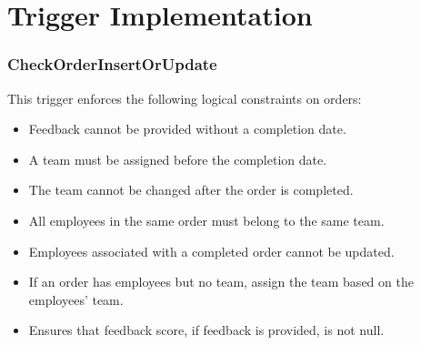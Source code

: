 \chapter{Trigger Implementation}

\subsection*{CheckOrderInsertOrUpdate}
This trigger enforces the following logical constraints on orders:
\begin{itemize}[label=-]
    \item Feedback cannot be provided without a completion date.
    \item A team must be assigned before the completion date.
    \item The team cannot be changed after the order is completed.
    \item All employees in the same order must belong to the same team.
    \item Employees associated with a completed order cannot be updated.
    \item If an order has employees but no team, assign the team based on the employees' team.
    \item Ensures that feedback score, if feedback is provided, is not null.
\end{itemize}
